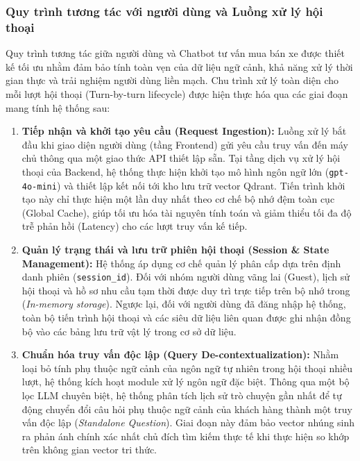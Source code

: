 \subsubsection{Quy trình tương tác với người dùng và Luồng xử lý hội thoại}

Quy trình tương tác giữa người dùng và Chatbot tư vấn mua bán xe được thiết kế tối ưu nhằm đảm bảo tính toàn vẹn của dữ liệu ngữ cảnh, khả năng xử lý thời gian thực và trải nghiệm người dùng liền mạch. Chu trình xử lý toàn diện cho mỗi lượt hội thoại (Turn-by-turn lifecycle) được hiện thực hóa qua các giai đoạn mang tính hệ thống sau:

\begin{enumerate}
    \item \textbf{Tiếp nhận và khởi tạo yêu cầu (Request Ingestion):} Luồng xử lý bắt đầu khi giao diện người dùng (tầng Frontend) gửi yêu cầu truy vấn đến máy chủ thông qua một giao thức API thiết lập sẵn. Tại tầng dịch vụ xử lý hội thoại của Backend, hệ thống thực hiện khởi tạo mô hình ngôn ngữ lớn (\texttt{gpt-4o-mini}) và thiết lập kết nối tới kho lưu trữ vector Qdrant. Tiến trình khởi tạo này chỉ thực hiện một lần duy nhất theo cơ chế bộ nhớ đệm toàn cục (Global Cache), giúp tối ưu hóa tài nguyên tính toán và giảm thiểu tối đa độ trễ phản hồi (Latency) cho các lượt truy vấn kế tiếp.
    
    \item \textbf{Quản lý trạng thái và lưu trữ phiên hội thoại (Session \& State Management):} Hệ thống áp dụng cơ chế quản lý phân cấp dựa trên định danh phiên (\texttt{session\_id}). Đối với nhóm người dùng vãng lai (Guest), lịch sử hội thoại và hồ sơ nhu cầu tạm thời được duy trì trực tiếp trên bộ nhớ trong (\textit{In-memory storage}). Ngược lại, đối với người dùng đã đăng nhập hệ thống, toàn bộ tiến trình hội thoại và các siêu dữ liệu liên quan được ghi nhận đồng bộ vào các bảng lưu trữ vật lý trong cơ sở dữ liệu.
    
    \item \textbf{Chuẩn hóa truy vấn độc lập (Query De-contextualization):} Nhằm loại bỏ tính phụ thuộc ngữ cảnh của ngôn ngữ tự nhiên trong hội thoại nhiều lượt, hệ thống kích hoạt module xử lý ngôn ngữ đặc biệt. Thông qua một bộ lọc LLM chuyên biệt, hệ thống phân tích lịch sử trò chuyện gần nhất để tự động chuyển đổi câu hỏi phụ thuộc ngữ cảnh của khách hàng thành một truy vấn độc lập (\textit{Standalone Question}). Giai đoạn này đảm bảo vector nhúng sinh ra phản ánh chính xác nhất chủ đích tìm kiếm thực tế khi thực hiện so khớp trên không gian vector tri thức.
    

\end{enumerate}
